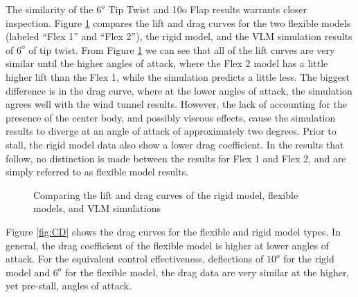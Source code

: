 \documentclass[11pt]{ucthesis}
\begin{document}
The similarity of the $6^o$ Tip Twist and 10o Flap results warrants closer inspection. Figure \ref{fig:6} compares the lift and drag curves for the two flexible models (labeled “Flex 1” and “Flex 2”), the rigid model, and the VLM simulation results of $6^o$ of tip twist. From Figure \ref{fig:6} we can see that all of the lift curves are very similar until the higher angles of attack, where the Flex 2 model has a little higher lift than the Flex 1, while the simulation predicts a little less. The biggest difference is in the drag curve, where at the lower angles of attack, the simulation agrees well with the wind tunnel results. However, the lack of accounting for the presence of the center body, and possibly viscous effects, cause the simulation results to diverge at an angle of attack of approximately two degrees. Prior to stall, the rigid model data also show a lower drag coefficient.  In the results that follow, no distinction is made between the results for Flex 1 and Flex 2, and are simply referred to as flexible model results.

\begin{figure}
\hfill
{}
\hfill
{}
\hfill
\caption{Comparing the lift and drag curves of the rigid model, flexible models, and VLM simulations}
\label{fig:6}
\end{figure}

Figure \ref{fig:CD} shows the drag curves for the flexible and rigid model types. In general, the drag coefficient of the flexible model is higher at lower angles of attack.  For the equivalent control effectiveness, deflections of $10^o$ for the rigid model and $6^o$ for the flexible model, the drag data are very similar at the higher, yet pre-stall, angles of attack. 
\end{document}
